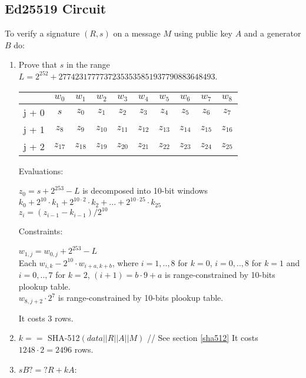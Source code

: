 \subsection{Ed25519 Circuit}
\label{section:eddsa}

To verify a signature $(R,s)$ on a message $M$ using public key $A$ and a generator $B$ do:
\begin{enumerate}
    \item Prove that $s$ in the range $L = 2^{252}+27742317777372353535851937790883648493$.
        \begin{center}
    \begin{tabular}{ c|c|c|c|c|c|c|c|c|c }
        & $w_0$  & $w_1$  & $w_2$  & $w_3$  & $w_4$  & $w_5$ & $w_6$ & $w_7$ & $w_8$  \\
            \hline
                j + 0 & $s$ & $z_0$ & $z_1$ & $z_2$ & $z_3$ & $z_4$ & $z_5$ & $z_6$ & $z_7$ \\
                j + 1 & $z_8$ & $z_{9}$ & $z_{10}$ & $z_{11}$ & $z_{12}$ & $z_{13}$ & $z_{14}$ & $z_{15}$ & $z_{16}$ \\
                j + 2 & $z_{17}$ & $z_{18}$ & $z_{19}$ & $z_{20}$ & $z_{21}$ & $z_{22}$ & $z_{23}$ & $z_{24}$ & $z_{25}$ \\
            \end{tabular}
        \end{center}
        Evaluations:
        \begin{center}
        $z_0 = s + 2^{253} - L$ is decomposed into 10-bit windows $k_0 + 2^{10} \cdot k_1 + 2^{10 \cdot 2} \cdot k_2 + ... + 2^{10 \cdot 25} \cdot k_{25}$ \\
        $z_i = (z_{i - 1} - k_{i - 1}) / 2^{10}$
        \end{center}
        Constraints:
        \begin{center}
            $w_{1, j} = w_{0,j} + 2^{253} - L $ \\
            Each $w_{i,k} - 2^{10} \cdot w_{i + a, k + b} $, where $i = 1,..,8$ for $k = 0$, $i = 0,..,8$ for $k = 1$ and $i = 0,..,7$ for $k = 2$, $(i + 1) = b \cdot 9 + a$  is range-constrained by 10-bits plookup table. \\
            $w_{8,j+2} \cdot 2^7 $ is range-constrained by 10-bits plookup table.
        \end{center}
	It costs $3$ rows.
    \item $k ==$ SHA-512$(data||R||A||M)$ // See section \ref{sha512}
    It costs $1248 \cdot 2 = 2496$ rows.
    \item $sB ?=? R + kA$:

\end{enumerate}
